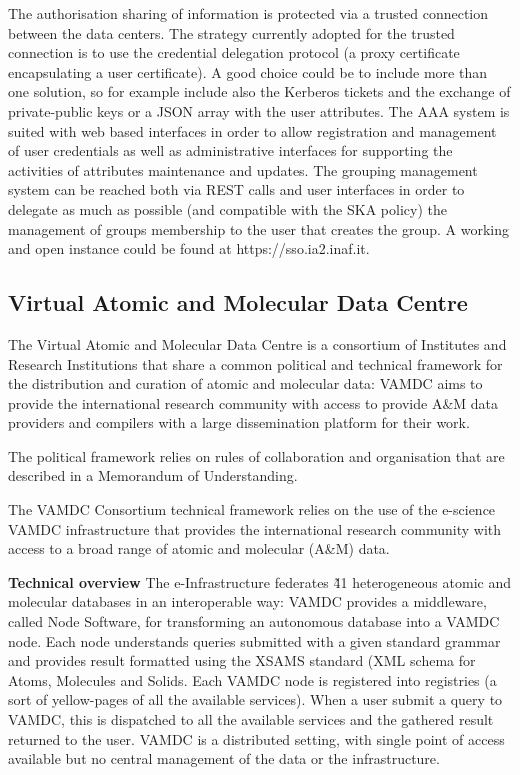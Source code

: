 \documentclass[fleqn,10pt]{wlscirep}
\begin{document}
{The authorisation sharing of information is protected via a trusted connection between the data centers. The strategy currently adopted for the trusted connection is to use the credential delegation protocol (a proxy certificate encapsulating a user certificate). A good choice could be to include more than one solution, so for example include also the Kerberos tickets and the exchange of private-public keys or a JSON array with the user attributes. The AAA system is suited with web based interfaces in order to allow registration and management of user credentials as well as administrative interfaces for supporting the activities of attributes maintenance and updates. The grouping management system can be reached both via REST calls and user interfaces in order to delegate as much as possible (and compatible with the SKA policy) the management of groups membership to the user that creates the group. A working and open instance could be found at https://sso.ia2.inaf.it.

\subsection{Virtual Atomic and Molecular Data Centre}
The Virtual Atomic and Molecular Data Centre is a consortium of Institutes and Research Institutions that share a common political and technical framework for the distribution and curation of atomic and molecular data: VAMDC aims to provide the international research community with access to provide A\&M data providers and compilers with a large dissemination platform for their work.
 
The political framework relies on rules of collaboration and organisation that are described in a Memorandum of Understanding.
 
The VAMDC Consortium technical framework relies on the use of the e-science VAMDC infrastructure that provides the international research community with access to a broad range of atomic and molecular (A\&M) data.
 
\textbf{Technical overview}
The e-Infrastructure federates \~41 heterogeneous atomic and molecular databases in an interoperable way: VAMDC provides a middleware, called Node Software, for transforming an autonomous database into a VAMDC node. Each node understands queries submitted with a given standard grammar\cite{vamdc-standards} and provides result formatted using the XSAMS standard (XML schema for Atoms, Molecules and Solids\cite{vamdc-ref}.  Each VAMDC node is registered into registries (a sort of yellow-pages of all the available services). When a user submit a query to VAMDC, this is dispatched to all the available services and the gathered result returned to the user. VAMDC is a distributed setting, with single point of access available\cite{vamdc-home} but no central management of the data or the infrastructure.
 
}
\end{document}
